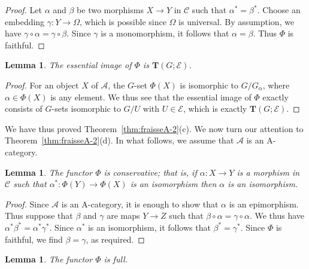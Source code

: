 \documentclass[12pt]{amsart}
\numberwithin{equation}{section}
\newtheorem{lemma}[equation]{Lemma}
\theoremstyle{definition}
\newcommand{\cA}{\mathcal{A}}
\newcommand{\rA}{\mathrm{A}}
\newcommand{\cC}{\mathcal{C}}
\newcommand{\sE}{\mathscr{E}}
\newcommand{\bT}{\mathbf{T}}
\begin{document}
\begin{proof}
Let $\alpha$ and $\beta$ be two morphisms $X \to Y$ in $\cC$ such that $\alpha^*=\beta^*$. Choose an embedding $\gamma \colon Y \to \Omega$, which is possible since $\Omega$ is universal. By assumption, we have $\gamma \circ \alpha=\gamma \circ \beta$. Since $\gamma$ is a monomorphism, it follows that $\alpha=\beta$. Thus $\Phi$ is faithful.
\end{proof}

\begin{lemma}
The essential image of $\Phi$ is $\bT(G; \sE)$.
\end{lemma}

\begin{proof}
For an object $X$ of $\cA$, the $G$-set $\Phi(X)$ is isomorphic to $G/G_{\alpha}$, where $\alpha \in \Phi(X)$ is any element. We thus see that the essential image of $\Phi$ exactly consists of $G$-sets isomorphic to $G/U$ with $U \in \sE$, which is exactly $\bT(G; \sE)$.
\end{proof}

We have thus proved Theorem~\ref{thm:fraisseA-2}(c). We now turn our attention to Theorem~\ref{thm:fraisseA-2}(d). In what follows, we assume that $\cA$ is an $\rA$-category.

\begin{lemma} \label{lem:fraisse-5}
The functor $\Phi$ is conservative; that is, if $\alpha \colon X \to Y$ is a morphism in $\cC$ such that $\alpha^* \colon \Phi(Y) \to \Phi(X)$ is an isomorphism then $\alpha$ is an isomorphism.
\end{lemma}

\begin{proof}
Since $\cA$ is an A-category, it is enough to show that $\alpha$ is an epimorphism. Thus suppose that $\beta$ and $\gamma$ are maps $Y \to Z$ such that $\beta \circ \alpha = \gamma \circ \alpha$. We thus have $\alpha^*\beta^*=\alpha^*\gamma^*$. Since $\alpha^*$ is an isomorphism, it follows that $\beta^*=\gamma^*$. Since $\Phi$ is faithful, we find $\beta=\gamma$, as required.
\end{proof}

\begin{lemma} \label{lem:fraisse-4}
The functor $\Phi$ is full.
\end{lemma}
\end{document}
